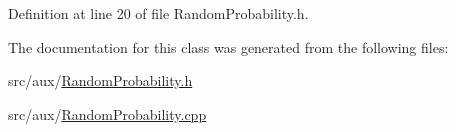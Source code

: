 Definition at line 20 of file Random\-Probability.\-h.



The documentation for this class was generated from the following files\-:\begin{DoxyCompactItemize}
\item 
src/aux/\hyperlink{_random_probability_8h}{Random\-Probability.\-h}\item 
src/aux/\hyperlink{_random_probability_8cpp}{Random\-Probability.\-cpp}\end{DoxyCompactItemize}
